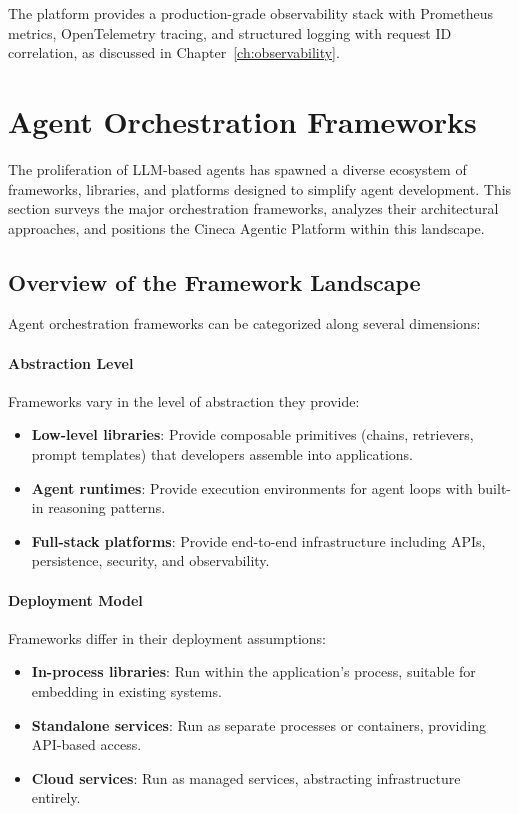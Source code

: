 \documentclass[a4paper,twoside]{sapthesis}
\begin{document}
The platform provides a production-grade observability stack with Prometheus metrics, OpenTelemetry tracing, and structured logging with request ID correlation, as discussed in Chapter~\ref{ch:observability}.

\section{Agent Orchestration Frameworks}
\label{sec:orchestration-frameworks}

The proliferation of LLM-based agents has spawned a diverse ecosystem of frameworks, libraries, and platforms designed to simplify agent development. This section surveys the major orchestration frameworks, analyzes their architectural approaches, and positions the Cineca Agentic Platform within this landscape.

\subsection{Overview of the Framework Landscape}

Agent orchestration frameworks can be categorized along several dimensions:

\paragraph{Abstraction Level}
Frameworks vary in the level of abstraction they provide:
\begin{itemize}
    \item \textbf{Low-level libraries}: Provide composable primitives (chains, retrievers, prompt templates) that developers assemble into applications.
    \item \textbf{Agent runtimes}: Provide execution environments for agent loops with built-in reasoning patterns.
    \item \textbf{Full-stack platforms}: Provide end-to-end infrastructure including APIs, persistence, security, and observability.
\end{itemize}

\paragraph{Deployment Model}
Frameworks differ in their deployment assumptions:
\begin{itemize}
    \item \textbf{In-process libraries}: Run within the application's process, suitable for embedding in existing systems.
    \item \textbf{Standalone services}: Run as separate processes or containers, providing API-based access.
    \item \textbf{Cloud services}: Run as managed services, abstracting infrastructure entirely.
\end{itemize}
\end{document}

